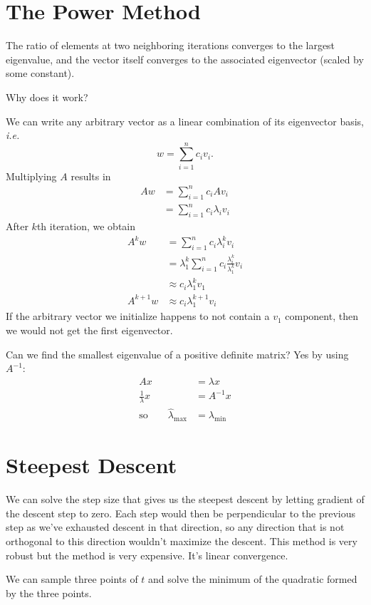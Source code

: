 \documentclass[class=article, crop=false]{standalone}
\theoremstyle{plain}
\theoremstyle{remark}
\begin{document}
\section{The Power Method}
The ratio of elements at two neighboring iterations converges to the largest eigenvalue, and the vector itself converges to the associated eigenvector (scaled by some constant).

Why does it work?

We can write any arbitrary vector as a linear combination of its eigenvector basis, \textit{i.e.} 
\[
w=\sum_{ i=1}^{ n} c_i v_i 
.\] 
Multiplying $A$ results in
\begin{align*}
	Aw&=\sum_{ i=1}^{ n} c_i A v_i\\
	&= \sum_{ i=1}^{ n} c_i \lambda_i v_i
\end{align*}
After $k$th iteration, we obtain
\begin{align*}
	A^{k}w&= \sum_{ i=1}^{ n} c_i \lambda_i^{k} v_i \\
	&= \lambda_1^{k} \sum_{ i=1}^{ n} c_i \frac{\lambda_i^{k}}{\lambda_1^{k}} v_i \\
	&\approx c_i \lambda_1^{k} v_1\\
	A^{k+1}w &\approx c_i \lambda_1^{k+1} v_i 
\end{align*}
If the arbitrary vector we initialize happens to not contain a $v_1$ component, then we would not get the first eigenvector.

Can we find the smallest eigenvalue of a positive definite matrix?
Yes by using $A^{-1}$:
\begin{align*}
	Ax&= \lambda x \\
	\frac{1}{\lambda} x &= A^{-1} x\\
	\text{so} \qquad \hat{\lambda}_{\max} &= \lambda_{\min} 
\end{align*}

\section{Steepest Descent}
We can solve the step size that gives us the steepest descent by letting gradient of the descent step to zero. Each step would then be perpendicular to the previous step as we've exhausted descent in that direction, so any direction that is not orthogonal to this direction wouldn't maximize the descent. This method is very robust but the method is very expensive. It's linear convergence.

We can sample three points of $t$ and solve the minimum of the quadratic formed by the three points.
\end{document}
